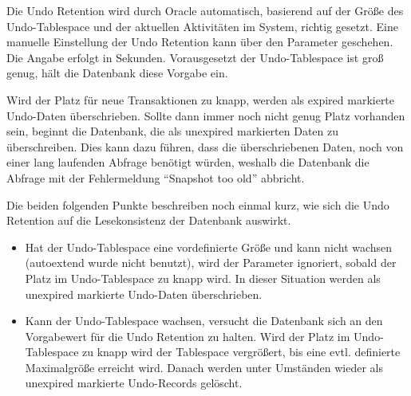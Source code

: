       Die Undo Retention wird durch Oracle automatisch, basierend auf der Größe des Undo-Tablespace und der aktuellen Aktivitäten im System, richtig gesetzt. Eine manuelle Einstellung der Undo Retention kann über den Parameter  geschehen. Die Angabe erfolgt in Sekunden. Vorausgesetzt der Undo-Tablespace ist groß genug, hält die Datenbank diese Vorgabe ein.

      Wird der Platz für neue Transaktionen zu knapp, werden als expired markierte Undo-Daten überschrieben. Sollte dann immer noch nicht genug Platz vorhanden sein, beginnt die Datenbank, die als unexpired markierten Daten zu überschreiben. Dies kann dazu führen, dass die überschriebenen Daten, noch von einer lang laufenden Abfrage benötigt würden, weshalb die Datenbank die Abfrage mit der Fehlermeldung \enquote{Snapshot too old} abbricht.

      Die beiden folgenden Punkte beschreiben noch einmal kurz, wie sich die Undo Retention auf die Lesekonsistenz der Datenbank auswirkt.
\clearpage
			\begin{itemize}
        \item Hat der Undo-Tablespace eine vordefinierte Größe und kann nicht wachsen (autoextend wurde nicht benutzt), wird der Parameter  ignoriert, sobald der Platz im Undo-Tablespace zu knapp wird. In dieser Situation werden als unexpired markierte Undo-Daten überschrieben.
        \item Kann der Undo-Tablespace wachsen, versucht die Datenbank sich an den Vorgabewert für die Undo Retention zu halten. Wird der Platz im Undo-Tablespace zu knapp wird der Tablespace vergrößert, bis eine evtl. definierte Maximalgröße erreicht wird. Danach werden unter Umständen wieder als unexpired markierte Undo-Records gelöscht.
      \end{itemize}

